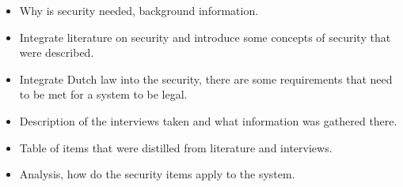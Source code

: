 \begin{itemize}
	\item Why is security needed, background information.	
	\item Integrate literature on security and introduce some concepts of security that were described.
	\item Integrate Dutch law into the security, there are some requirements that need to be met for a system to be legal.
	\item Description of the interviews taken and what information was gathered there.
	\item Table of items that were distilled from literature and interviews.
	\item Analysis, how do the security items apply to the system.
\end{itemize}